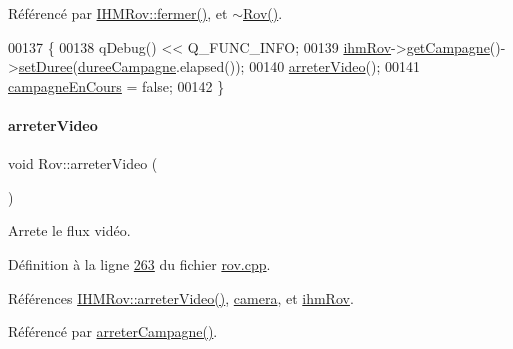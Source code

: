 Référencé par \hyperlink{ihmrov_8cpp_source_l00253}{I\+H\+M\+Rov\+::fermer()}, et \hyperlink{rov_8cpp_source_l00022}{$\sim$\+Rov()}.


\begin{DoxyCode}
00137 \{
00138     qDebug() << Q\_FUNC\_INFO;
00139     \hyperlink{class_rov_a9b1c1c3b4e268a32e69b2ea4c863b817}{ihmRov}->\hyperlink{class_i_h_m_rov_ab3e8686eef9233b4c1e6711cf1c4576a}{getCampagne}()->\hyperlink{class_campagne_aff9aebbc64c40ce2c1b5ae584c7a8d71}{setDuree}(\hyperlink{class_rov_a148a0ff28fc2dbed7b65466d77297b8a}{dureeCampagne}.elapsed());
00140     \hyperlink{class_rov_a241368439666a2549faff42931d82dfb}{arreterVideo}();
00141     \hyperlink{class_rov_abc9d61d10d8fb5e99283d3775baf98a8}{campagneEnCours} = \textcolor{keyword}{false};
00142 \}
\end{DoxyCode}
\mbox{\label{class_rov_a241368439666a2549faff42931d82dfb}} 
\paragraph{\texorpdfstring{arreter\+Video}{arreterVideo}}
{\footnotesize\ttfamily void Rov\+::arreter\+Video (\begin{DoxyParamCaption}{ }\end{DoxyParamCaption})\hspace{0.3cm}{\ttfamily [slot]}}



Arrete le flux vidéo. 



Définition à la ligne \hyperlink{rov_8cpp_source_l00263}{263} du fichier \hyperlink{rov_8cpp_source}{rov.\+cpp}.



Références \hyperlink{ihmrov_8cpp_source_l00234}{I\+H\+M\+Rov\+::arreter\+Video()}, \hyperlink{rov_8h_source_l00096}{camera}, et \hyperlink{rov_8h_source_l00094}{ihm\+Rov}.



Référencé par \hyperlink{rov_8cpp_source_l00136}{arreter\+Campagne()}.


